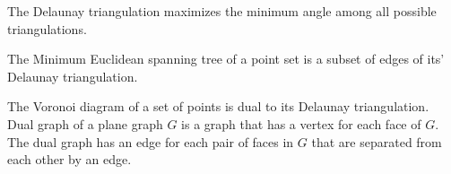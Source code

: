 The Delaunay triangulation maximizes the minimum angle among all possible triangulations.

The Minimum Euclidean spanning tree of a point set is a subset of edges of its' Delaunay triangulation.

The Voronoi diagram of a set of points is dual to its Delaunay triangulation. Dual graph of a plane graph $G$ is a graph that has a vertex for each face of $G$. The dual graph has an edge for each pair of faces in $G$ that are separated from each other by an edge.